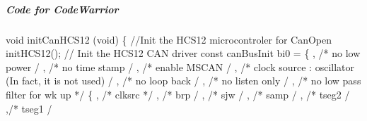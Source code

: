 \documentclass[a4paper,12pt]{book}
\begin{document}
\subparagraph{Code for CodeWarrior}
{\ttfamily
void initCanHCS12 (void)\newline
 \{ \space \newline
  \space //Init the HCS12 microcontroler for CanOpen \newline
  \space initHCS12();\newline
  \space \space // Init the HCS12 \space CAN driver\newline
  \space const canBusInit bi0 = \{\newline
  \space \space {}, \space \space \space /* no low power \space \space \space \space \space \space \space \space \space \space \space \space \space \space \space \space */
\newline
  \space \space {}, \space \space \space /* no time stamp
\space \space \space \space \space \space \space \space \space \space \space \space \space \space \space */\newline
  \space \space {}, \space \space \space /* enable MSCAN
\space \space \space \space \space \space \space \space \space \space \space \space \space \space \space \space */\newline
  \space \space {}, \space \space \space /* clock source : oscillator (In fact, it is not used)
\space \space */\newline
  \space \space {}, \space \space \space /* no loop back
\space \space \space \space \space \space \space \space \space \space \space \space \space \space \space \space */\newline
  \space \space {}, \space \space \space /* no listen only
\space \space \space \space \space \space \space \space \space \space \space \space \space \space */\newline
  \space \space {}, \space \space \space /* no low pass filter for wk up */\newline
  \space \space \space \{\newline
  \space \space \space {}, /* clksrc */\newline
  \space \space \space {}, /* brp \space \space \space */\newline
  \space \space \space {}, /* sjw \space \space \space */\newline
  \space \space \space {}, /* samp \space \space */\newline
  \space \space \space {}, /* tseg2 \space */\newline
  \space \space \space {},/* tseg1 \space */\newline
}
\end{document}
